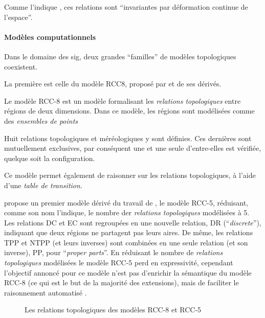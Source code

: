 Comme l'indique \textcite{Duchene2019}, ces relations sont
\enquote{invariantes par déformation continue de l’espace}.



\paragraph{Modèles computationnels}

Dans le domaine des \ac{sig}, deux grandes \enquote{familles} de
modèles topologiques coexistent.

La première est celle du modèle RCC8, proposé par
\textcite{Randell1992} et de ses dérivés.

Le modèle RCC-8 est un modèle formalisant les \emph{relations
  topologiques} entre régions de deux dimensions. Dans ce modèle, les
régions sont modélisées comme des \emph{ensembles de points}


Huit relations topologiques et méréologiques y sont définies. Ces
dernières sont mutuellement exclusives, par conséquent une et une
seule d'entre-elles est vérifiée, quelque soit la configuration.

Ce modèle permet également de raisonner sur les relations
topologiques, à l'aide d'une \emph{table de transition.}


\textcite{Bennett1994} propose un premier modèle dérivé du travail de
\textcite{Randell1992}, le modèle RCC-5, réduisant, comme son nom
l'indique, le nombre der \emph{relations topologiques} modélisées à
5. Les relations DC et EC sont regroupées en une nouvelle relation, DR
(\enquote{\emph{discrete}}), indiquant que deux régions ne partagent
pas leurs aires. De même, les relations TPP et NTPP (et leurs
inverses) sont combinées en une seule relation (et son inverse), PP,
pour \enquote{\emph{proper parts}}. En réduisant le nombre de
\emph{relations topologiques} modélisées le modèle RCC-5 perd en
expressivité, cependant l'objectif annoncé pour ce modèle n'est pas
d’enrichir la sémantique du modèle RCC-8 (ce qui est le but de la
majorité des extensions), mais de faciliter le raisonnement automatisé
\textcite{Bennett1994}.

\begin{figure}
  \centering
  \caption{Les relations topologiques des modèles RCC-8 et RCC-5}
  \label{fig:RCC}
\end{figure}

